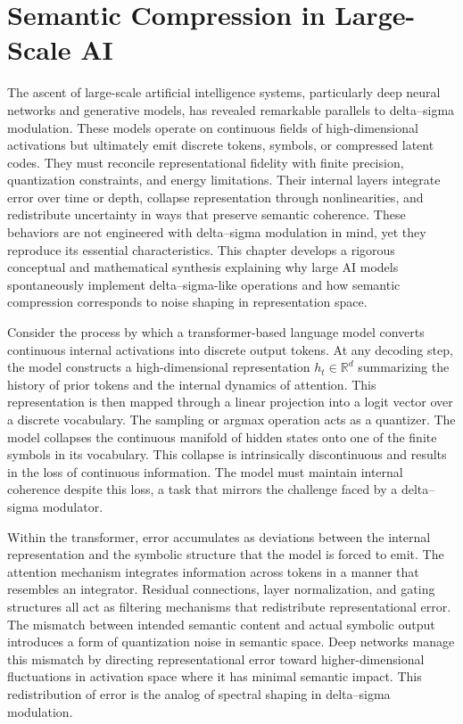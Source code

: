 
\chapter{Semantic Compression in Large-Scale AI}

The ascent of large-scale artificial intelligence systems, particularly deep neural networks and generative models, has revealed remarkable parallels to delta–sigma modulation. These models operate on continuous fields of high-dimensional activations but ultimately emit discrete tokens, symbols, or compressed latent codes. They must reconcile representational fidelity with finite precision, quantization constraints, and energy limitations. Their internal layers integrate error over time or depth, collapse representation through nonlinearities, and redistribute uncertainty in ways that preserve semantic coherence. These behaviors are not engineered with delta–sigma modulation in mind, yet they reproduce its essential characteristics. This chapter develops a rigorous conceptual and mathematical synthesis explaining why large AI models spontaneously implement delta–sigma-like operations and how semantic compression corresponds to noise shaping in representation space.

Consider the process by which a transformer-based language model converts continuous internal activations into discrete output tokens. At any decoding step, the model constructs a high-dimensional representation \(h_t \in \mathbb{R}^d\) summarizing the history of prior tokens and the internal dynamics of attention. This representation is then mapped through a linear projection into a logit vector over a discrete vocabulary. The sampling or argmax operation acts as a quantizer. The model collapses the continuous manifold of hidden states onto one of the finite symbols in its vocabulary. This collapse is intrinsically discontinuous and results in the loss of continuous information. The model must maintain internal coherence despite this loss, a task that mirrors the challenge faced by a delta–sigma modulator.

Within the transformer, error accumulates as deviations between the internal representation and the symbolic structure that the model is forced to emit. The attention mechanism integrates information across tokens in a manner that resembles an integrator. Residual connections, layer normalization, and gating structures all act as filtering mechanisms that redistribute representational error. The mismatch between intended semantic content and actual symbolic output introduces a form of quantization noise in semantic space. Deep networks manage this mismatch by directing representational error toward higher-dimensional fluctuations in activation space where it has minimal semantic impact. This redistribution of error is the analog of spectral shaping in delta–sigma modulation.

